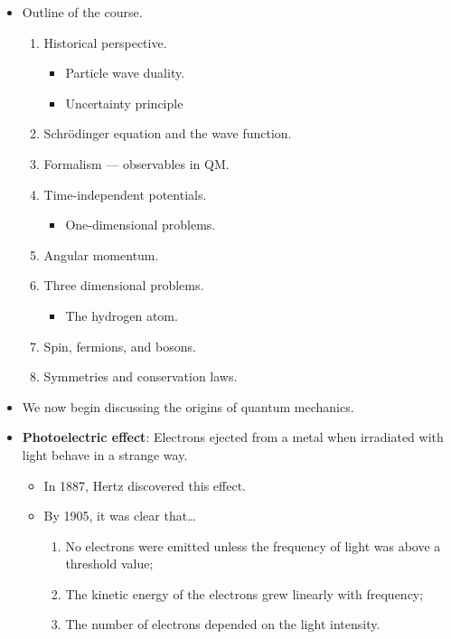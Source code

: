 \documentclass[../notes.tex]{subfiles}
\begin{document}
\begin{itemize}
\begin{itemize}
    \end{itemize}
    \item Outline of the course.
    \begin{enumerate}
        \item Historical perspective.
        \begin{itemize}
            \item Particle wave duality.
            \item Uncertainty principle
        \end{itemize}
        \item Schr\"{o}dinger equation and the wave function.
        \item Formalism --- observables in QM.
        \item Time-independent potentials.
        \begin{itemize}
            \item One-dimensional problems.
        \end{itemize}
        \item Angular momentum.
        \item Three dimensional problems.
        \begin{itemize}
            \item The hydrogen atom.
        \end{itemize}
        \item Spin, fermions, and bosons.
        \item Symmetries and conservation laws.
    \end{enumerate}
    \item We now begin discussing the origins of quantum mechanics.
    \item \textbf{Photoelectric effect}: Electrons ejected from a metal when irradiated with light behave in a strange way.
    \begin{itemize}
        \item In 1887, Hertz discovered this effect.
        \item By 1905, it was clear that\dots
        \begin{enumerate}
            \item No electrons were emitted unless the frequency of light was above a threshold value;
            \item The kinetic energy of the electrons grew linearly with frequency;
            \item The number of electrons depended on the light intensity.
        \end{enumerate}

\end{itemize}
\end{itemize}
\end{document}
